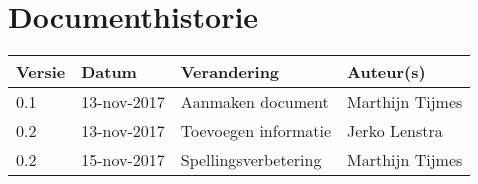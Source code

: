 \section{Documenthistorie}

\begin{tabularx}{\textwidth}{| l | l | X | l |}
	\hline
	\textbf{Versie} & \textbf{Datum} & \textbf{Verandering} & \textbf{Auteur(s)} \\ \hline
	0.1	& 13-nov-2017 & Aanmaken document & Marthijn Tijmes \\ \hline
    0.2 & 13-nov-2017 & Toevoegen informatie & Jerko Lenstra \\ \hline
    0.2 & 15-nov-2017 & Spellingsverbetering & Marthijn Tijmes \\ \hline

\end{tabularx}

